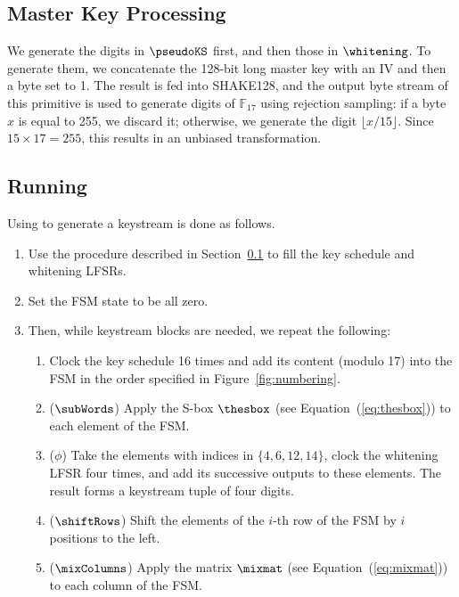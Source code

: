 \subsection{Master Key Processing}
\label{app:spec-masterkey}

We generate the digits in $\pseudoKS$ first, and then those in $\whitening$. To generate them, we concatenate the 128-bit long master key with an IV and then a byte set to 1. The result is fed into \textsf{SHAKE128}, and the output byte stream of this primitive is used to generate digits of $\mathbb{F}_{17}$ using rejection sampling: if a byte $x$ is equal to 255, we discard it; otherwise, we generate the digit $\lfloor x / 15 \rfloor$. Since $15 \times 17 = 255$, this results in an unbiased transformation.


\subsection{Running \coolName{}}
\label{app:spec-transistor}

Using \coolName{} to generate a keystream is done as follows.
\begin{enumerate}
\item Use the procedure described in Section~\ref{app:spec-masterkey} to fill the key schedule and whitening LFSRs.
\item Set the FSM state to be all zero.
\item Then, while keystream blocks are needed, we repeat the following:
  \begin{enumerate}
  \item Clock the key schedule 16 times and add its content (modulo 17) into the FSM in the order specified in Figure~\ref{fig:numbering}.
  \item ($\subWords$) Apply the \gls{S-box} $\thesbox$ (see Equation~(\ref{eq:thesbox})) to each element of the FSM.
  \item ($\phi$) Take the elements with indices in $\{ 4, 6, 12, 14\}$, clock the whitening LFSR four times, and add its successive outputs to these elements. The result forms a keystream tuple of four digits.
  \item ($\shiftRows$) Shift the elements of the $i$-th row of the FSM by $i$ positions to the left.
  \item ($\mixColumns$) Apply the matrix $\mixmat$ (see Equation~(\ref{eq:mixmat})) to each column of the FSM.
  \end{enumerate}
\end{enumerate}


